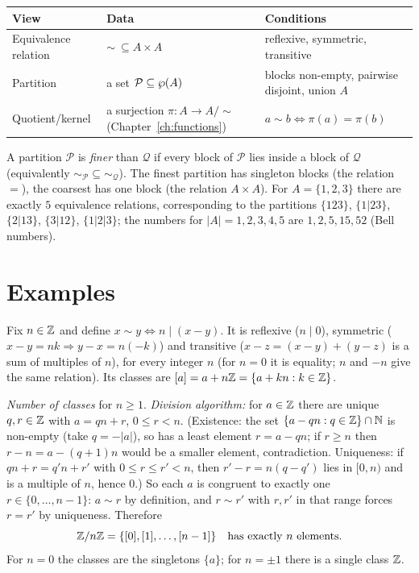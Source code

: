 \begin{center}
	\begin{tabular}{@{}p{3.3cm}p{4.2cm}p{7.3cm}@{}}
		\toprule
		\textbf{View} & \textbf{Data} & \textbf{Conditions}\\
		\midrule
		Equivalence relation & $\sim\ \subseteq A\times A$ & reflexive, symmetric, transitive\\
		Partition & a set $\mathcal P\subseteq\wp(A)$ & blocks non-empty, pairwise disjoint, union $A$\\
		Quotient/kernel & a surjection $\pi:A\to A/{\sim}$ (Chapter~\ref{ch:functions}) & $a\sim b\iff\pi(a)=\pi(b)$\\
		\bottomrule
	\end{tabular}
\end{center}
A partition $\mathcal P$ is \emph{finer} than $\mathcal Q$ if every block of $\mathcal P$ lies inside a block of $\mathcal Q$ (equivalently $\sim_{\mathcal P}\subseteq\sim_{\mathcal Q}$). The finest partition has singleton blocks (the relation $=$), the coarsest has one block (the relation $A\times A$). For $A=\{1,2,3\}$ there are exactly $5$ equivalence relations, corresponding to the partitions $\{123\}$, $\{1|23\}$, $\{2|13\}$, $\{3|12\}$, $\{1|2|3\}$; the numbers for $|A|=1,2,3,4,5$ are $1,2,5,15,52$ (Bell numbers).

\section{Examples}

\begin{example}\label{ex:congruence}
	Fix $n\in\mathbb{Z}$ and define $x\sim y\iff n\mid(x-y)$. It is reflexive ($n\mid0$), symmetric ($x-y=nk\Rightarrow y-x=n(-k)$) and transitive ($x-z=(x-y)+(y-z)$ is a sum of multiples of $n$), for every integer $n$ (for $n=0$ it is equality; $n$ and $-n$ give the same relation). Its classes are $[a]=a+n\mathbb{Z}=\{a+kn:k\in\mathbb{Z}\}$.
	
	\emph{Number of classes} for $n\ge1$. \emph{Division algorithm:} for $a\in\mathbb{Z}$ there are unique $q,r\in\mathbb{Z}$ with $a=qn+r$, $0\le r<n$. (Existence: the set $\{a-qn:q\in\mathbb{Z}\}\cap\mathbb{N}$ is non-empty (take $q=-|a|$), so has a least element $r=a-qn$; if $r\ge n$ then $r-n=a-(q+1)n$ would be a smaller element, contradiction. Uniqueness: if $qn+r=q'n+r'$ with $0\le r\le r'<n$, then $r'-r=n(q-q')$ lies in $[0,n)$ and is a multiple of $n$, hence $0$.) So each $a$ is congruent to exactly one $r\in\{0,\dots,n-1\}$: $a\sim r$ by definition, and $r\sim r'$ with $r,r'$ in that range forces $r=r'$ by uniqueness. Therefore
	\[
	\mathbb{Z}/n\mathbb{Z}=\{[0],[1],\dots,[n-1]\}\quad\text{has exactly $n$ elements.}
	\]
	For $n=0$ the classes are the singletons $\{a\}$; for $n=\pm1$ there is a single class $\mathbb{Z}$.
\end{example}

